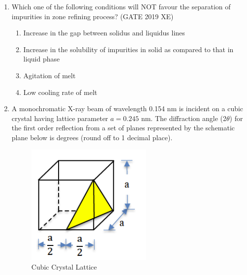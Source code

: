 \documentclass[journal,12pt,onecolumn]{IEEEtran}
\begin{document}
\begin{enumerate}


\hfill{(GATE 2019 XE)} \\
\begin{multicols}{2}
\begin{enumerate}
\item P-4; Q-1; R-2; S-3
\item P-3; Q-2; R-1; S-4
\item P-3; Q-2; R-4; S-1
\item P-2; Q-3; R-1; S-4
\end{enumerate}
\end{multicols}

\item Which one of the following conditions will NOT favour the separation of impurities in zone refining process?
\hfill{(GATE 2019 XE)} \\
\begin{multicols}{2}
\begin{enumerate}
\item Increase in the gap between solidus and liquidus lines
\item Increase in the solubility of impurities in solid as compared to that in liquid phase
\item Agitation of melt
\item Low cooling rate of melt
\end{enumerate}
\end{multicols}

\newpage

\item A monochromatic X-ray beam of wavelength 0.154 nm is incident on a cubic crystal having lattice parameter $a=0.245$ nm. The diffraction angle (2$\theta$) for the first order reflection from a set of planes represented by the schematic plane below is \underline{\hspace{2cm}} degrees (round off to 1 decimal place).

\begin{figure}[htbp]
  \centering
  \includegraphics[width=.5\columnwidth]{figs/C/fig1.png} 
  \caption{Cubic Crystal Lattice}
  \label{fig:figs/C/fig1.png}
\end{figure}


\end{enumerate}
\end{document}
